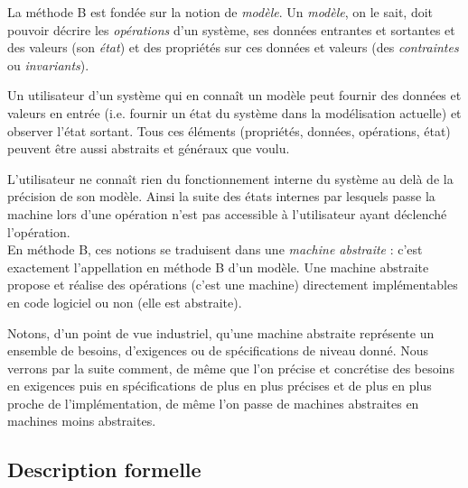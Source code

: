 \documentclass[10pt,a4paper]{article}
\begin{document}
La méthode B est fondée sur la notion de \emph{modèle}. Un \emph{modèle}, on le sait, doit pouvoir décrire les \emph{opérations} d'un système, ses données entrantes et sortantes et des valeurs (son \emph{état}) et des propriétés sur ces données et valeurs (des \emph{contraintes} ou \emph{invariants}).

Un utilisateur d'un système qui en connaît un modèle peut fournir des données et valeurs en entrée (i.e. fournir un état du système dans la modélisation actuelle) et observer l'état sortant. Tous ces  éléments (propriétés, données, opérations, état) peuvent être aussi abstraits et généraux que voulu.

L'utilisateur ne connaît rien du fonctionnement interne du système au delà de la précision de son modèle. Ainsi la suite des états internes par lesquels passe la machine lors d'une opération n'est pas accessible à l'utilisateur ayant déclenché l'opération.
\\

En méthode B, ces notions se traduisent dans une \emph{machine abstraite} : c'est exactement l'appellation en méthode B d'un modèle. Une machine abstraite propose et réalise des opérations (c'est une machine) directement implémentables en code logiciel ou non (elle est abstraite).

Notons, d'un point de vue industriel, qu'une machine abstraite représente un ensemble de besoins, d'exigences ou de spécifications de niveau donné. Nous verrons par la suite comment, de même que l'on précise et concrétise des besoins en exigences puis en spécifications de plus en plus précises et de plus en plus proche de l'implémentation, de même l'on passe de machines abstraites en machines moins abstraites.

\subsection{Description formelle}
\end{document}

